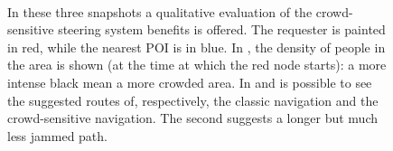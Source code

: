\documentclass[12pt,a4paper,twoside,openright]{book}
\begin{document}
\begin{figure}
~
~
 \caption[Crowd sensitive steering in Vienna]{In these three snapshots a qualitative evaluation of the crowd-sensitive steering system benefits is offered. The requester is painted in red, while the nearest POI is in blue. In , the density of people in the area is shown (at the time at which the red node starts): a more intense black mean a more crowded area. In  and  is possible to see the suggested routes of, respectively, the classic navigation and the crowd-sensitive navigation. The second suggests a longer but much less jammed path.}
 \label{img:ahpc-steering}
\end{figure}
\end{document}
